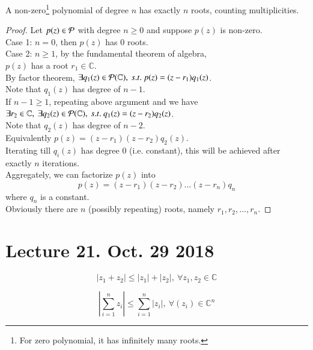 \documentclass[10pt]{article}
\begin{document}
	\begin{theorem}
		A non-zero\footnote{For zero polynomial, it has infinitely many roots.} polynomial of degree $n$ has exactly $n$ roots, counting multiplicities.
	\end{theorem}
	\begin{proof}
		Let $p(z) \in \mathcal{{P}}$ with degree $n \geq 0$ and suppose $p(z)$ is non-zero. \\
		Case 1: $n=0$, then $p(z)$ has 0 roots. \\
		Case 2: $n \geq 1$, by the fundamental theorem of algebra, \\
		$p(z)$ has a root $r_1 \in \mathbb{C}$. \\
		By factor theorem, $\exists q_1(z) \in \mathcal{{P}}(\mathbb{C}),\ s.t.\ p(z) = (z-r_1)q_1(z)$. \\
		Note that $q_1(z)$ has degree of $n-1$. \\
		If $n-1 \geq 1$, repeating above argument and we have \\
		$\exists r_2 \in \mathbb{C},\ \exists q_2(z) \in \mathcal{{P}}(\mathbb{C}),\ s.t.\ q_1(z) = (z-r_2)q_2(z)$. \\
		Note that $q_2(z)$ has degree of $n-2$. \\
		Equivalently $p(z) = (z-r_1)(z-r_2)q_2(z)$. \\
		Iterating till $q_i(z)$ has degree 0 (i.e. constant), this will be achieved after exactly $n$ iterations. \\
		Aggregately, we can factorize $p(z)$ into 
		\[
			p(z) = (z-r_1)(z-r_2)\dots(z-r_n)q_n
		\]
		where $q_n$ is a constant. \\
		Obviously there are $n$ (possibly repeating) roots, namely $r_1, r_2, \dots, r_n$.
	\end{proof}

	\section{Lecture 21. Oct. 29 2018}
		\begin{lemma}
			\[
				|z_1 + z_2| \leq |z_1| + |z_2|,\ \forall z_1, z_2 \in \mathbb{C}
			\]
		\end{lemma}

		\begin{lemma}
			\[
				| \sum_{i=1}^{n} {z_i} | \leq \sum_{i=1}^{n} |z_i|,\ \forall (z_i) \in \mathbb{C}^n
			\]
		\end{lemma}
\end{document}
